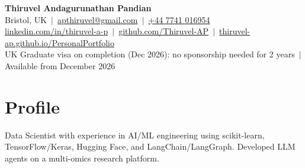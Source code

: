 \documentclass[a4paper,10pt]{article}
\begin{document}
\fontsize{10.5}{12.6}\selectfont

\begin{center}
  {\LARGE\bfseries Thiruvel Andagurunathan Pandian}\\[3pt]
  Bristol, UK \,$|$\, \href{mailto:apthiruvel@gmail.com}{apthiruvel@gmail.com} \,$|$\, \href{tel:+447741016954}{+44 7741 016954}\\[1pt]
\href{https://www.linkedin.com/in/thiruvel-a-p/}{linkedin.com/in/thiruvel-a-p} \,$|$\, \href{https://github.com/Thiruvel-AP}{github.com/Thiruvel-AP} \,$|$\, \href{https://thiruvel-ap.github.io/PersonalPortfolio/}{thiruvel-ap.github.io/PersonalPortfolio}\\[1pt]
  UK Graduate visa on completion (Dec 2026): no sponsorship needed for 2 years \,$|$\, Available from December 2026
\end{center}

\section{Profile}
Data Scientist with experience in AI/ML engineering using scikit-learn, TensorFlow/Keras, Hugging Face, and LangChain/LangGraph. Developed LLM agents on a multi-omics research platform.

\end{document}
